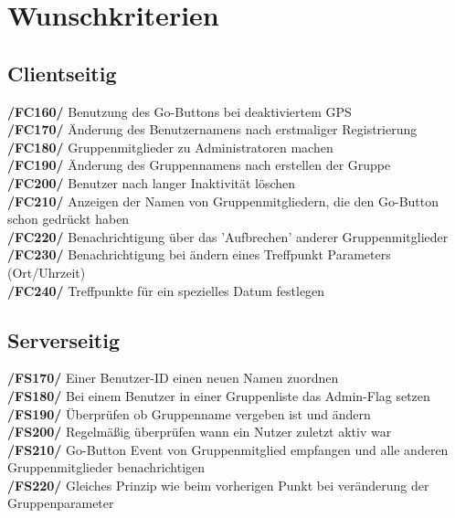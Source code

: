 \section{Wunschkriterien}
\subsection{Clientseitig}
     \textbf{/FC160/} Benutzung des Go-Buttons bei deaktiviertem GPS\\
     \textbf{/FC170/} Änderung des Benutzernamens nach erstmaliger Registrierung\\
     \textbf{/FC180/} Gruppenmitglieder zu Administratoren machen                \\
     \textbf{/FC190/} Änderung des Gruppennamens nach erstellen der Gruppe        \\
     \textbf{/FC200/} Benutzer nach langer Inaktivität löschen                     \\
     \textbf{/FC210/} Anzeigen der Namen von Gruppenmitgliedern, die den Go-Button schon gedrückt haben\\
     \textbf{/FC220/} Benachrichtigung über das 'Aufbrechen' anderer Gruppenmitglieder\\
     \textbf{/FC230/} Benachrichtigung bei ändern eines Treffpunkt Parameters (Ort/Uhrzeit)\\
     \textbf{/FC240/} Treffpunkte für ein spezielles Datum festlegen\\
\subsection{Serverseitig}
     \textbf{/FS170/} Einer Benutzer-ID einen neuen Namen zuordnen\\
     \textbf{/FS180/} Bei einem Benutzer in einer Gruppenliste das Admin-Flag setzen\\
     \textbf{/FS190/} Überprüfen ob Gruppenname vergeben ist und ändern\\
     \textbf{/FS200/} Regelmäßig überprüfen wann ein Nutzer zuletzt aktiv war\\
     \textbf{/FS210/} Go-Button Event von Gruppenmitglied empfangen und alle anderen Gruppenmitglieder benachrichtigen\\
     \textbf{/FS220/} Gleiches Prinzip wie beim vorherigen Punkt bei veränderung der Gruppenparameter\\
